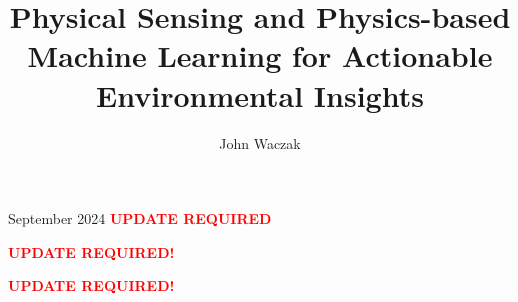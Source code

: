 \documentclass[doublespacing]{utdthesis}
\author{John Waczak}
\title{Physical Sensing and Physics-based Machine Learning for Actionable Environmental Insights}
\begin{document}
\frontmatter

\signaturepage



\maketitle

\begin{acks}{September 2024}
  \textbf{\textcolor{red}{UPDATE REQUIRED}}
\end{acks}



\tableofcontents
\listoffigures %
\listoftables %

\mainmatter




%













% 






\appendix %




\begin{thesisbib}  %
  
\end{thesisbib}  %



\begin{biosketch}
  \textbf{\textcolor{red}{UPDATE REQUIRED!}}
\end{biosketch}


\begin{vita}  %
  \textbf{\textcolor{red}{UPDATE REQUIRED!}}
\end{vita}  %
\end{document}
